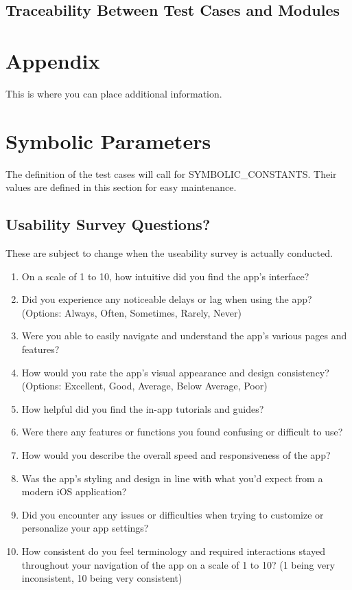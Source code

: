 \documentclass[12pt, titlepage]{article}
\begin{document}
\subsection{Traceability Between Test Cases and Modules}

				




\newpage

\section{Appendix}

This is where you can place additional information.

\section{Symbolic Parameters}

The definition of the test cases will call for SYMBOLIC\_CONSTANTS.
Their values are defined in this section for easy maintenance.

\subsection{Usability Survey Questions?}

These are subject to change when the useability survey is actually conducted.

\begin{enumerate}
    \item On a scale of 1 to 10, how intuitive did you find the app's interface?
    \item Did you experience any noticeable delays or lag when using the app? (Options: Always, Often, Sometimes, Rarely, Never)
    \item Were you able to easily navigate and understand the app's various pages and features?
    \item How would you rate the app's visual appearance and design consistency? (Options: Excellent, Good, Average, Below Average, Poor)
    \item How helpful did you find the in-app tutorials and guides?
    \item Were there any features or functions you found confusing or difficult to use?
    \item How would you describe the overall speed and responsiveness of the app?
    \item Was the app's styling and design in line with what you'd expect from a modern iOS application?
    \item Did you encounter any issues or difficulties when trying to customize or personalize your app settings?
    \item How consistent do you feel terminology and required interactions stayed throughout your navigation of the app on a scale of 1 to 10? (1 being very inconsistent, 10 being very consistent)
\end{enumerate}
\end{document}
